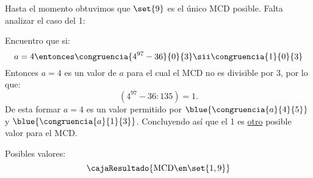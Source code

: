 Hasta el momento obtuvimos que $\set{9}$ es el único MCD posible. Falta analizar el caso del 1:

Encuentro que si:
$$
  a = 4
  \entonces
  \congruencia{4^{97} - 36}{0}{3}
  \sii
  \congruencia{1}{0}{3}
$$
Entonces $a = 4$ es un valor de $a$ para el cual el MCD no es divisible por 3, por lo que:
$$
  (4^{97} -36 : 135) = 1.
$$
De esta formar $a =4$ es un valor permitido por $\blue{\congruencia{a}{4}{5} }$ y $\blue{\congruencia{a}{1}{3} }$.
Concluyendo así que el 1 es \underline{otro} posible valor para el MCD.\par
Posibles valores:
$$
  \cajaResultado{
    \text{MCD} \en \set{1, 9}
  }
$$

\begin{aportes}
  \item {}
  \item {}
\end{aportes}

